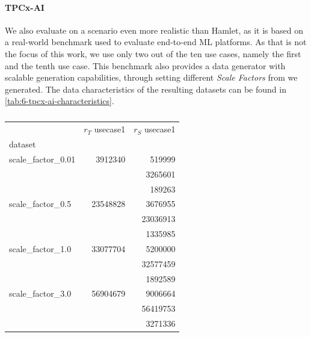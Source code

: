 \paragraph{TPCx-AI \cite{tpcx-ai}} We also evaluate on a scenario even more realistic than Hamlet, as it is based on a real-world benchmark used to evaluate end-to-end ML platforms. As that is not the focus of this work, we use only two out of the ten use cases, namely the first and the tenth use case. This benchmark also provides a data generator with scalable generation capabilities, through setting different \emph{Scale Factors} from  we generated. The data characteristics of the resulting datasets can be found in \autoref{tab:6-tpcx-ai-characteristics}.
\begin{table}[ht]
  \centering
  \begin{tabular}{lrr}
    \toprule
    {}                  & $r_T$ usecase1 & $r_S$ usecase1 \\
    dataset             &                &                \\
    \midrule
    scale\_factor\_0.01 & 3912340        & 519999         \\
                        &                & 3265601        \\
                        &                & 189263         \\
    scale\_factor\_0.5  & 23548828       & 3676955        \\
                        &                & 23036913       \\
                        &                & 1335985        \\
    scale\_factor\_1.0  & 33077704       & 5200000        \\
                        &                & 32577459       \\
                        &                & 1892589        \\
    scale\_factor\_3.0  & 56904679       & 9006664        \\
                        &                & 56419753       \\
                        &                & 3271336        \\
    \bottomrule
  \end{tabular}
  \caption{}
  \label{tab:6-tpcx-ai-characteristics}
\end{table}

